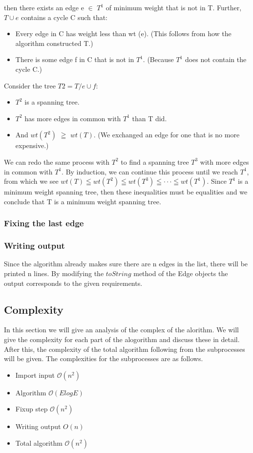 \documentclass{article}
\newcommand{\bigO}[1]{\mathcal{O}(#1)}
\begin{document}
then there exists an edge e $\in$ $T^1$ of minimum weight that is not in T. Further, $T \cup e$ contains a
cycle C such that:
\begin{itemize}
  \item Every edge in C has weight less than wt (e). (This follows from how the algorithm constructed
T.)
  \item There is some edge f in C that is not in $T^1$. (Because $T^1$ does not contain the cycle C.)
\end{itemize}
Consider the tree $T2 = T / {e}\cup{f}:$
\begin{itemize}
  \item $T^2$ is a spanning tree.
  \item $T^2$ has more edges in common with $T^1$ than T did.
  \item And $wt(T^2)$ $\geqq $ $wt(T)$. (We exchanged an edge for one that is no more expensive.)
\end{itemize}
We can redo the same process with $T^2$ to find a spanning tree $T^3$ with more edges in common with
$T^1$. By induction, we can continue this process until we reach $T^1$, from which we see
\newline
\newline
$wt (T) \leqq wt (T^2) \leqq wt (T^3) \leqq \cdot \cdot \cdot \leqq wt (T^1).$
\newline
\newline
Since $T^1$ is a minimum weight spanning tree, then these inequalities must be equalities and we
conclude that T is a minimum weight spanning tree.

\subsubsection{Fixing the last edge}

\subsubsection{Writing output}
Since the algorithm already makes sure there are n edges in the list, there will be printed n lines. By modifying the $toString$ method of the Edge objects the output corresponds to the given requirements.

\subsection{Complexity}
In this section we will give an analysis of the complex of the alorithm. We will give the complexity for each part of the alogorithm and discuss these in detail. After this, the complexity of the total algorithm following from the subprocesses will be given. The complexities for the subprocesses are as follows.
\begin{itemize}
  \item Import input $\bigO{n^2}$
  \item Algorithm $\bigO{E log E}$
  \item Fixup step $\bigO{n^2}$
  \item Writing output $O(n)$
  \item Total algorithm $\bigO{n^2}$
\end{itemize}
\end{document}

